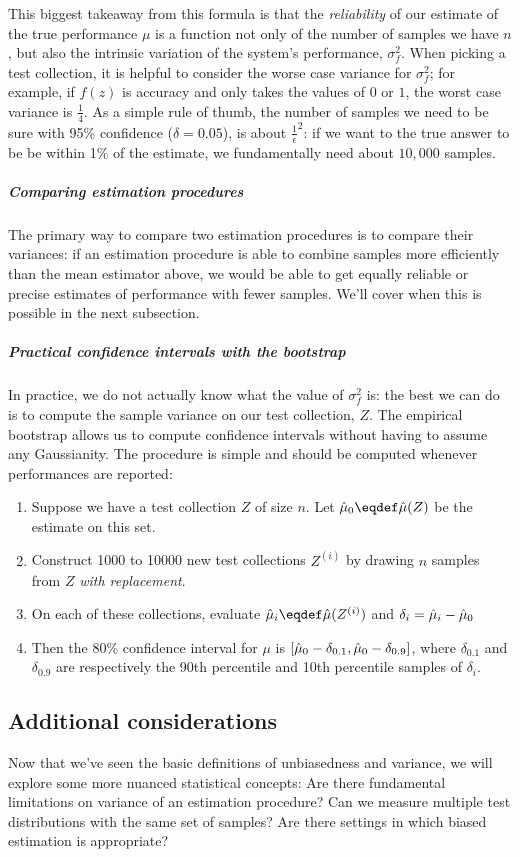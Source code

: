 This biggest takeaway from this formula is that the \textit{reliability} of our estimate of the true performance $\mu$ is a function not only of the number of samples we have $n$, but also the intrinsic variation of the system's performance, $\sigma^2_f$.
When picking a test collection, it is helpful to consider the worse case variance for $\sigma^2_f$; for example, if $f(z)$ is accuracy and only takes the values of $0$ or $1$, the worst case variance is $\frac{1}{4}$.
As a simple rule of thumb, the number of samples we need to be sure with 95\% confidence ($\delta = 0.05$), is about $\frac{1}{\epsilon}^2$: if we want to the true answer to be be within 1\% of the estimate, we fundamentally need about $10,000$ samples.

\subparagraph{Comparing estimation procedures}
The primary way to compare two estimation procedures is to compare their variances: if an estimation procedure is able to combine samples more efficiently than the mean estimator above, we would be able to get equally reliable or precise estimates of performance with fewer samples.
We'll cover when this is possible in the next subsection.

\subparagraph{Practical confidence intervals with the bootstrap}
In practice, we do not actually know what the value of $\sigma^2_f$ is: the best we can do is to compute the sample variance on our test collection, $Z$.
The empirical bootstrap allows us to compute confidence intervals without having to assume any Gaussianity.
The procedure is simple and should be computed whenever performances are reported:
\begin{enumerate}
  \item Suppose we have a test collection $Z$ of size $n$. Let $\muh_0 \eqdef \muh(Z)$ be the estimate on this set.
  \item Construct 1000 to 10000 new test collections $Z^{(i)}$ by drawing $n$ samples from $Z$ \textit{with replacement}.
  \item On each of these collections, evaluate $\muh_{i} \eqdef \muh(Z^{(i)})$ and $\delta_i = \hat{\mu}_i - \hat{\mu}_0$
  \item Then the 80\% confidence interval for $\mu$ is $[\hat{\mu}_0 - \delta_{0.1}, \hat{\mu}_0 - \delta_{0.9}]$, where $\delta_{0.1}$ and $\delta_{0.9}$ are respectively the 90th percentile and 10th percentile samples of $\delta_i$. 
\end{enumerate}

\subsection{Additional considerations}
Now that we've seen the basic definitions of unbiasedness and variance, we will explore some more nuanced statistical concepts:
  Are there fundamental limitations on variance of an estimation procedure?
  Can we measure multiple test distributions with the same set of samples?
  Are there settings in which biased estimation is appropriate? 

